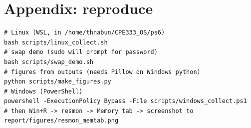 \documentclass[a4paper,11pt]{article}
\begin{document}
\section*{Appendix: reproduce}
\begin{lstlisting}[caption={Reproduce all captures}]
# Linux (WSL, in /home/thnabun/CPE333_OS/ps6)
bash scripts/linux_collect.sh
# swap demo (sudo will prompt for password)
bash scripts/swap_demo.sh
# figures from outputs (needs Pillow on Windows python)
python scripts/make_figures.py
# Windows (PowerShell)
powershell -ExecutionPolicy Bypass -File scripts/windows_collect.ps1
# then Win+R -> resmon -> Memory tab -> screenshot to report/figures/resmon_memtab.png
\end{lstlisting}
\end{document}

